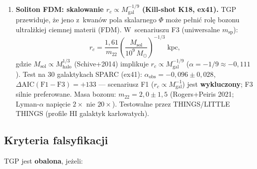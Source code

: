 \begin{enumerate}[nosep]
  \item \textbf{Soliton FDM: skalowanie $r_c \propto M_{\mathrm{gal}}^{-1/9}$
        (Kill-shot K18, ex41).}
        TGP przewiduje, \.ze jeno z~kwan\'ow pola skalarnego
        $\Phi$ mo\.ze pe\l{}ni\'c rol\k{e} bozonu
        ultral\.zkiej ciemnej materii (FDM).
        W~scenariuszu F3 (uniwersalne $m_{\mathrm{sp}}$):
        \begin{equation}\label{eq:rc-F3}
          r_c = \frac{1{,}61}{m_{22}}
                \left(\frac{M_{\mathrm{sol}}}{10^9\,M_\odot}\right)^{-1/3}
                \;\mathrm{kpc},
        \end{equation}
        gdzie $M_{\mathrm{sol}} \propto M_{\mathrm{halo}}^{1/3}$
        (Schive+2014) implikuje $r_c \propto M_{\mathrm{gal}}^{-1/9}$
        ($\alpha = -1/9 \approx -0{,}111$).
        Test na 30 galaktykach SPARC (ex41):
        $\alpha_{\mathrm{obs}} = -0{,}096 \pm 0{,}028$,
        $\Delta\mathrm{AIC}(\mathrm{F1-F3}) = +133$
        --- scenariusz F1 ($r_c \propto M_{\mathrm{gal}}^{-1}$) jest
        \textbf{wykluczony}; F3 silnie preferowane.
        Masa bozonu: $m_{22} = 2{,}0 \pm 1{,}5$
        (Rogers+Peiris 2021; Lyman-$\alpha$ napięcie $2\times$ nie $20\times$).
        Testowalne przez THINGS/LITTLE THINGS
        (profile HI galaktyk karłowatych).
\end{enumerate}

\subsection{Kryteria falsyfikacji}\label{ssec:falsy}

TGP jest \textbf{obalona}, je\.zeli:

